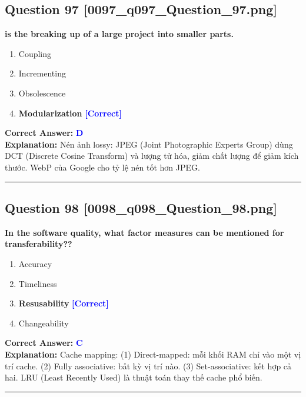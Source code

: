 \documentclass[11pt,a4paper]{article}
\begin{document}
\begin{minipage}{\textwidth}
\subsection*{Question 97 \quad \footnotesize{[0097\_q097\_Question\_97.png]}}
\noindent \textbf{is the breaking up of a large project into smaller parts.}

\begin{enumerate}[label=\Alph*.]
    \item Coupling
    \item Incrementing
    \item Obsolescence
    \item \textbf{Modularization} \hfill \textcolor{blue}{\textbf{[Correct]}}
\end{enumerate}

\noindent \textbf{Correct Answer:} \textcolor{blue}{\textbf{D}} \\[2pt]
\noindent \textbf{Explanation:} Nén ảnh lossy: JPEG (Joint Photographic Experts Group) dùng DCT (Discrete Cosine Transform) và lượng tử hóa, giảm chất lượng để giảm kích thước. WebP của Google cho tỷ lệ nén tốt hơn JPEG.

\par\vspace{0.3cm}
\hrule
\vspace{0.3cm}
\end{minipage}

\begin{minipage}{\textwidth}
\subsection*{Question 98 \quad \footnotesize{[0098\_q098\_Question\_98.png]}}
\noindent \textbf{In the software quality, what factor measures can be mentioned for transferability??}

\begin{enumerate}[label=\Alph*.]
    \item Accuracy
    \item Timeliness
    \item \textbf{Resusability} \hfill \textcolor{blue}{\textbf{[Correct]}}
    \item Changeability
\end{enumerate}

\noindent \textbf{Correct Answer:} \textcolor{blue}{\textbf{C}} \\[2pt]
\noindent \textbf{Explanation:} Cache mapping: (1) Direct-mapped: mỗi khối RAM chỉ vào một vị trí cache. (2) Fully associative: bất kỳ vị trí nào. (3) Set-associative: kết hợp cả hai. LRU (Least Recently Used) là thuật toán thay thế cache phổ biến.

\par\vspace{0.3cm}
\hrule
\vspace{0.3cm}
\end{minipage}
\end{document}
